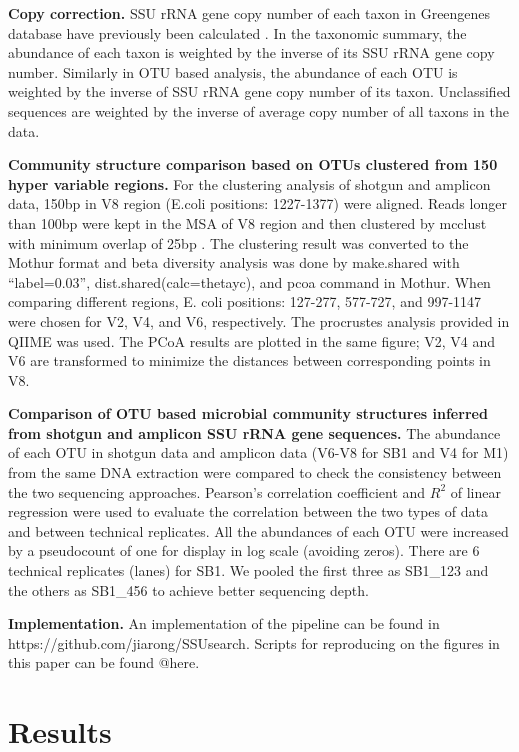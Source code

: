 \documentclass[12pt]{article}
\begin{document}
{\bf Copy correction.} SSU rRNA gene copy number of each taxon in
Greengenes database have previously been calculated
\cite{copyrighter}. In the taxonomic summary, the abundance of each
taxon is weighted by the inverse of its SSU rRNA gene copy
number. Similarly in OTU based analysis, the abundance of each OTU is
weighted by the inverse of SSU rRNA gene copy number of its taxon.
Unclassified sequences are weighted by the inverse of average copy
number of all taxons in the data.

{\bf Community structure comparison based on OTUs clustered from 150
hyper variable regions.} For the clustering analysis of shotgun and
amplicon data, 150bp in V8 region (E.coli positions: 1227-1377) were
aligned. Reads longer than 100bp were kept in the MSA of V8 region and
then clustered by mcclust with minimum overlap of 25bp
\cite{rdp2009}. The clustering result was converted to the Mothur format
and beta diversity analysis was done by make.shared with
``label=0.03'', dist.shared(calc=thetayc), and pcoa command in
Mothur. When comparing different regions, E. coli positions: 127-277,
577-727, and 997-1147 were chosen for V2, V4, and V6,
respectively. The procrustes analysis provided in QIIME \cite{qiime}
was used. The PCoA results are plotted in the same figure; V2, V4 and
V6 are transformed to minimize the distances between corresponding
points in V8.

{\bf Comparison of OTU based microbial community structures inferred
from shotgun and amplicon SSU rRNA gene sequences.} The abundance of each
OTU in shotgun data and amplicon data (V6-V8 for SB1 and V4 for M1)
from the same DNA extraction were compared to check the consistency
between the two sequencing approaches. Pearson's correlation
coefficient and $R^2$ of linear regression were used to evaluate the
correlation between the two types of data and between 
technical replicates. All the abundances of each OTU were increased by
a pseudocount of one for display in log scale (avoiding zeros). There are
6 technical replicates (lanes) for SB1. We pooled the first three as
SB1\_123 and the others as SB1\_456 to achieve better sequencing
depth.

{\bf Implementation.} An implementation of the pipeline can be found
in https://github.com/jiarong/SSUsearch. Scripts for reproducing on
the figures in this paper can be found @here.

\section{Results}
\end{document}
